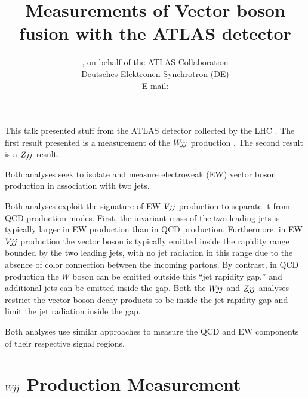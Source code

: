 \documentclass{PoS}
\title{Measurements of Vector boson fusion with the ATLAS detector}
\author{\speaker{Kurt Brendlinger},
        on behalf of the ATLAS Collaboration\\
       Deutsches Elektronen-Synchrotron (DE)\\
       E-mail: \email{kurt.brendlinger@cern.ch}}
\def\wjj{\ensuremath{W\kern -0.2em j\kern -0.1emj}\xspace}
\def\zjj{\ensuremath{Z\kern -0.1em j\kern -0.1emj}\xspace}
\def\vjj{\ensuremath{V\kern -0.2em j\kern -0.1emj}\xspace}
\def\w{\ensuremath{W}\xspace}
\def\mjj{\ensuremath{M_{jj}}\xspace}
\begin{document}
This talk presented stuff from the ATLAS detector \cite{Aad:2008zzm} collected by the
LHC \cite{Evans:2008zzb}.
The first result presented is a measurement of the \wjj production \cite{Aaboud:2017fye}.
The second result is a \zjj result.

Both analyses seek to isolate and measure electroweak (EW) vector boson production in association with
two jets.

Both analyses exploit the signature of EW \vjj production to separate it from QCD production modes.
First, the invariant mass of the two leading jets is typically larger in EW production than
in QCD production.
Furthermore, in EW \vjj production the vector boson is typically emitted inside the
rapidity range bounded by the two leading jets, with no jet radiation in this range due to the absence
of color connection between the incoming partons.
By contrast, in QCD production the \w boson can be emitted outside this ``jet rapidity gap,'' and
additional jets can be emitted inside the gap.
Both the \wjj and \zjj analyses restrict the vector boson decay products to be inside the jet rapidity
gap and limit the jet radiation inside the gap.


Both analyses use similar approaches to measure the QCD and EW components of their respective signal
regions.

\section{\wjj Production Measurement}
\end{document}
